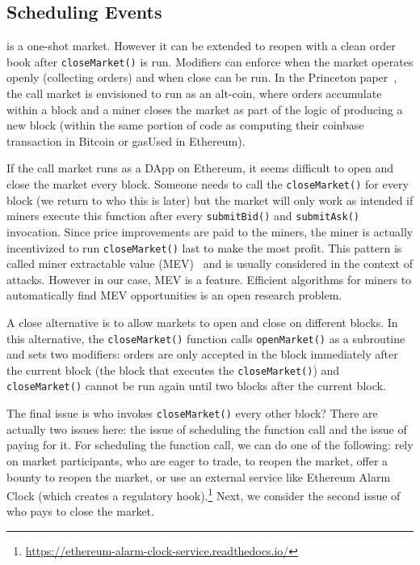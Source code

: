 
\subsection{Scheduling Events}

\cm is a one-shot market. However it can be extended to reopen with a clean order book after \texttt{closeMarket()} is run. Modifiers can enforce when the market operates openly (collecting orders) and when close can be run. In the Princeton paper~\cite{clark2014decentralizing}, the call market is envisioned to run as an alt-coin, where orders accumulate within a block and a miner closes the market as part of the logic of producing a new block (\ie within the same portion of code as computing their coinbase transaction in Bitcoin or gasUsed in Ethereum). 

If the call market runs as a DApp on Ethereum, it seems difficult to open and close the market every block. Someone needs to call the \texttt{closeMarket()} for every block (we return to who this is later) but the market will only work as intended if miners execute this function after every \texttt{submitBid()} and \texttt{submitAsk()} invocation. Since price improvements are paid to the miners, the miner is actually incentivized to run \texttt{closeMarket()} last to make the most profit. This pattern is called miner extractable value (MEV)~\cite{daian2019flash} and is usually considered in the context of attacks. However in our case, MEV is a feature. Efficient algorithms for miners to automatically find MEV opportunities is an open research problem.


A close alternative is to allow markets to open and close on different blocks. In this alternative, the \texttt{closeMarket()} function calls \texttt{openMarket()} as a subroutine and sets two modifiers: orders are only accepted in the block immediately after the current block (\ie the block that executes the \texttt{closeMarket()}) and \texttt{closeMarket()} cannot be run again until two blocks after the current block. 


The final issue is who invokes \texttt{closeMarket()} every other block? There are actually two issues here: the issue of scheduling the function call and the issue of paying for it. For scheduling the function call, we can do one of the following: rely on market participants, who are eager to trade, to reopen the market, offer a bounty to reopen the market, or use an external service like Ethereum Alarm Clock (which creates a regulatory hook).\footnote{\url{https://ethereum-alarm-clock-service.readthedocs.io/}} Next, we consider the second issue of who pays to close the market. 


